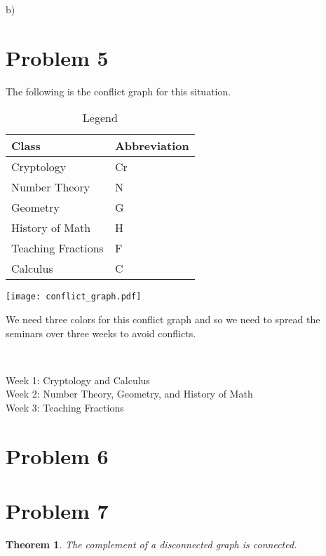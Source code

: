 \documentclass{article}
\newtheorem{thm}{Theorem}
\begin{document}
\noindent b) 


\section*{Problem 5}
The following is the conflict graph for this situation.
\begin{table}\caption{Legend}
\centering
\begin{tabular}{|l|l|}\hline
{\bf Class} & {\bf Abbreviation}\\\hline
Cryptology & Cr\\\hline
Number Theory & N\\\hline
Geometry & G\\\hline
History of Math & H\\\hline
Teaching Fractions & F\\\hline
Calculus & C\\\hline
\end{tabular}
\end{table}
\begin{center}
\texttt{[image: conflict\_graph.pdf]}
\end{center}

We need three colors for this conflict graph and so we need to spread the seminars over three weeks to avoid conflicts.

~

\noindent Week 1: Cryptology and Calculus\\
Week 2: Number Theory, Geometry, and History of Math\\
Week 3: Teaching Fractions

\section*{Problem 6}

\section*{Problem 7}

\begin{thm}\label{t7}
The complement of a disconnected graph is connected.
\end{thm}
\end{document}
